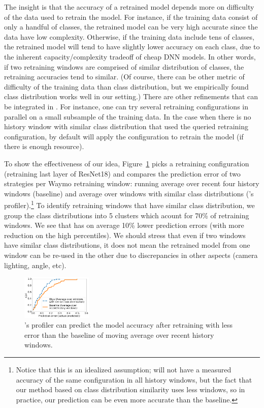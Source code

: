 The insight is that the accuracy of a retrained model depends more on difficulty of the data used to retrain the model. 
For instance, if the training data consist of only a handful of classes, the retrained model can be very high accurate since the data have low complexity.
Otherwise, if the training data include tens of classes, the retrained model will tend to have slightly lower accuracy on each class, due to the inherent capacity/complexity tradeoff of cheap DNN models.
In other words, if two retraining windows are comprised of similar distribution of classes, the retraining accuracies tend to similar. (Of course, there can be other metric of difficulty of the training data than class distribution, but we empirically found class distribution works well in our setting.)
There are other refinements that can be integrated in \name.
For instance, one can try several retraining configurations in parallel on a small subsample of the training data. 
In the case when there is no history window with similar class distribution that used the queried retraining configuration, by default \name will apply the configuration to retrain the model (if there is enough resource).

To show the effectiveness of our idea, Figure~\ref{fig:profiler-error} picks a retraining configuration (retraining last layer of ResNet18) and compares the prediction error of two strategies per Waymo retraining window: running average over recent four history windows (baseline) and average over windows with similar class distributions (\name's profiler).\footnote{Notice that this is an idealized assumption; \name will not have a measured accuracy of the same configuration in all history windows, but the fact that our method based on class distribution similarity uses less windows, so in practice, our prediction can be even more accurate than the baseline.}
To identify retraining windows that have similar class distribution, we group the class distributions into 5 clusters which acount for 70\% of retraining windows.
We see that \name has on average 10\% lower prediction errors (with more reduction on the high percentiles).
We should stress that even if two windows have similar class distributions, it does not mean the retrained model from one window can be re-used in the other due to discrepancies in other aspects (camera lighting, angle, etc).

\begin{figure}[t]
\centering
\includegraphics[width=0.3\textwidth]{figures/eval_placeholders/cdf-profiler-error.png}
\vspace{-0.2cm}
\caption{\name's profiler can predict the model accuracy after retraining with less error than the baseline of moving average over recent history windows.
\vspace{-0.2cm}}
\label{fig:profiler-error}
\end{figure}
